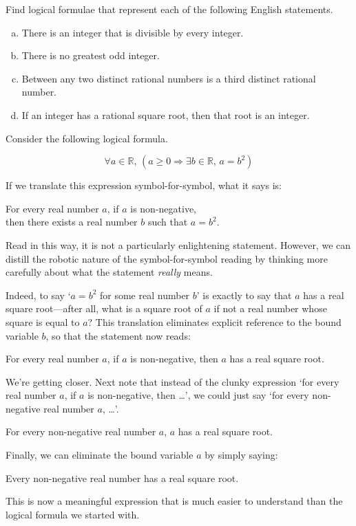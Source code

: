 \begin{exercise}
\label{exEnglishToLogicalFormulae}
Find logical formulae that represent each of the following English statements.
\begin{enumerate}[(a)]
\item There is an integer that is divisible by every integer.
\item There is no greatest odd integer.
\item Between any two distinct rational numbers is a third distinct rational number.
\item If an integer has a rational square root, then that root is an integer.
\end{enumerate}
\end{exercise}

\begin{example}
Consider the following logical formula.

\[\forall a \in \mathbb{R},\, (a \ge 0 \Rightarrow \exists b \in \mathbb{R},\, a = b^2)\]

If we translate this expression symbol-for-symbol, what it says is:
\begin{center}
For every real number $a$, if $a$ is non-negative,\\
then there exists a real number $b$ such that $a=b^2$.
\end{center}

Read in this way, it is not a particularly enlightening statement. However, we can distill the robotic nature of the symbol-for-symbol reading by thinking more carefully about what the statement \textit{really} means.

Indeed, to say `$a = b^2$ for some real number $b$' is exactly to say that $a$ has a real square root---after all, what is a square root of $a$ if not a real number whose square is equal to $a$? This translation eliminates explicit reference to the bound variable $b$, so that the statement now reads:

\begin{center}
For every real number $a$, if $a$ is non-negative, then $a$ has a real square root.
\end{center}

We're getting closer. Next note that instead of the clunky expression `for every real number $a$, if $a$ is non-negative, then \dots{}', we could just say `for every non-negative real number $a$, \dots{}'.

\begin{center}
For every non-negative real number $a$, $a$ has a real square root.
\end{center}

Finally, we can eliminate the bound variable $a$ by simply saying:

\begin{center}
Every non-negative real number has a real square root.
\end{center}

This is now a meaningful expression that is much easier to understand than the logical formula we started with.
\end{example}

